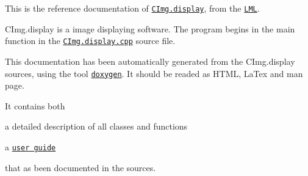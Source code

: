This is the reference documentation of \href{http://www.meol.cnrs.fr/}{\tt C\-Img.\-display}, from the \href{http://www.univ-lille1.fr/lml/}{\tt L\-M\-L}.\par
\par
 C\-Img.\-display is a image displaying software. The program begins in the main function in the \href{CImg_8display_8cpp.html}{\tt C\-Img.\-display.\-cpp} source file.\par
\par
 This documentation has been automatically generated from the C\-Img.\-display sources, using the tool \href{http://www.doxygen.org}{\tt doxygen}. It should be readed as H\-T\-M\-L, La\-Tex and man page.\par
 It contains both \begin{DoxyItemize}
\item a detailed description of all classes and functions \item a \href{user.html}{\tt user guide}\end{DoxyItemize}
that as been documented in the sources.

